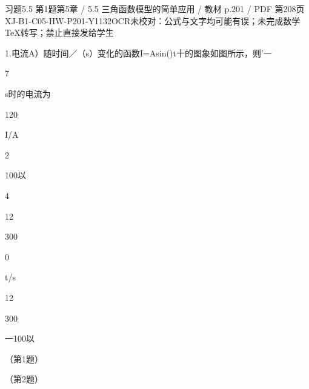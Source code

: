 \begin{bankitem}{习题5.5 第1题}{第5章 / 5.5 三角函数模型的简单应用 / 教材 p.201 / PDF 第208页}{XJ-B1-C05-HW-P201-Y1132}{OCR未校对：公式与文字均可能有误；未完成数学TeX转写；禁止直接发给学生}
\begin{ocrdraft}
\par
1.电流A）随时间／（s）变化的函数I=Asin()t十的图象如图所示，则'一
\par
7
\par
s时的电流为
\par
120
\par
I/A
\par
2
\par
100以
\par
4
\par
12
\par
300
\par
0
\par
t/s
\par
12
\par
300
\par
一100以
\par
（第1题）
\par
（第2题）
\end{ocrdraft}
\end{bankitem}
